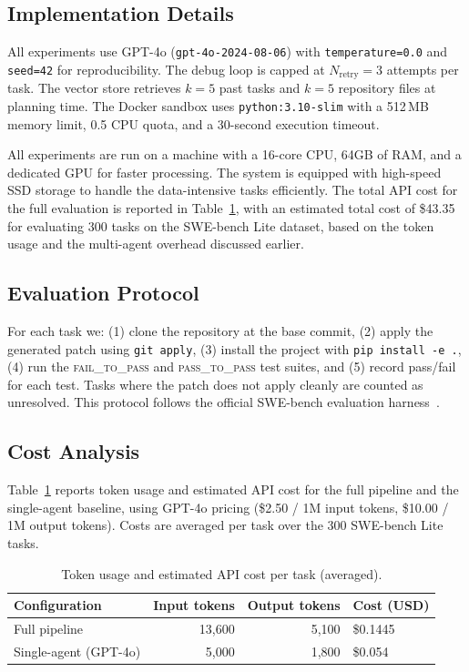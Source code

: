 \subsection{Implementation Details}

All \agentforge{} experiments use GPT-4o
(\texttt{gpt-4o-2024-08-06}) with
\texttt{temperature=0.0} and \texttt{seed=42} for
reproducibility. The debug loop is capped at
$N_\text{retry}=3$ attempts per task. The vector
store retrieves $k=5$ past tasks and $k=5$ repository
files at planning time. The Docker sandbox uses
\texttt{python:3.10-slim} with a 512\,MB memory limit,
0.5 CPU quota, and a 30-second execution timeout.

All experiments are run on a machine with a 16-core CPU, 64GB of RAM, and a dedicated GPU for faster processing. The system is equipped with high-speed SSD storage to handle the data-intensive tasks efficiently. The total API cost for the full evaluation is reported in Table~\ref{tab:cost}, with an estimated total cost of \$43.35 for evaluating 300 tasks on the SWE-bench Lite dataset, based on the token usage and the multi-agent overhead discussed earlier.

\subsection{Evaluation Protocol}

For each task we: (1) clone the repository at the base
commit, (2) apply the generated patch using
\texttt{git apply}, (3) install the project with
\texttt{pip install -e .}, (4) run the \textsc{fail\_to\_pass}
and \textsc{pass\_to\_pass} test suites, and (5) record
pass/fail for each test. Tasks where the patch does not
apply cleanly are counted as unresolved. This protocol
follows the official SWE-bench evaluation
harness~\cite{jimenez2024swebench}.


\subsection{Cost Analysis}
\label{sec:cost}

Table~\ref{tab:cost} reports token usage and estimated API cost for the full \agentforge{} pipeline and the single-agent baseline, using GPT-4o pricing (\$2.50 / 1M input tokens, \$10.00 / 1M output tokens). Costs are averaged per task over the 300 SWE-bench Lite tasks.

\begin{table}[t]
\centering
\caption{Token usage and estimated API cost per task (averaged).}
\label{tab:cost}
\begin{tabular}{lrrl}
\toprule
Configuration & Input tokens & Output tokens & Cost (USD) \\
\midrule
Full pipeline & 13,600 & 5,100 & \$0.1445 \\
Single-agent (GPT-4o) & 5,000 & 1,800 & \$0.054 \\
\bottomrule
\end{tabular}
\end{table}

